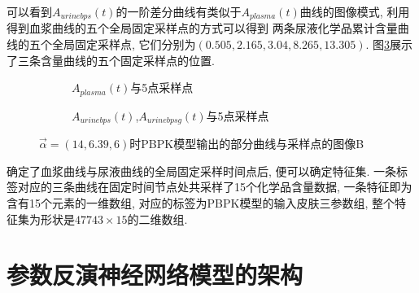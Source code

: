 \documentclass[a4paper,punct=banjiao,twoside]{ctexrep}
\theoremstyle{plain}
\theoremstyle{definition}
\theoremstyle{remark}
\begin{document}
可以看到$A_{urinebps}(t)$的一阶差分曲线有类似于$A_{plasma}(t)$曲线的图像模式, 利用得到血浆曲线的五个全局固定采样点的方式可以得到
两条尿液化学品累计含量曲线的五个全局固定采样点, 它们分别为$(0.505,2.165, 3.04 ,8.265,13.305)$. 图\ref{曲线与采样点5}展示了三条含量曲线的五个固定采样点的位置.

\begin{figure}[H]
  \centering
  \begin{subfigure}{0.45\textwidth}
    \centering
    \resizebox{1\textwidth}{!}{}
    \caption{$A_{plasma}(t)$与5点采样点}
    \label{曲线与采样点5a}
  \end{subfigure}
  \begin{subfigure}{0.45\textwidth}
    \centering
    \resizebox{1\textwidth}{!}{}
    \caption{$A_{urinebps}(t)$,$A_{urinebpsg}(t)$与5点采样点}
    \label{曲线与采样点5b}
  \end{subfigure}


  \caption{$\vec{\alpha}=(14,6.39,6)$时PBPK模型输出的部分曲线与采样点的图像B}
  \label{曲线与采样点5}
\end{figure}

确定了血浆曲线与尿液曲线的全局固定采样时间点后, 便可以确定特征集. 
一条标签对应的三条曲线在固定时间节点处共采样了15个化学品含量数据, 一条特征即为含有15个元素的一维数组, 对应的标签为PBPK模型的输入皮肤三参数组, 整个特征集为形状是$47743\times 15$的二维数组.


\section{参数反演神经网络模型的架构}
\end{document}
